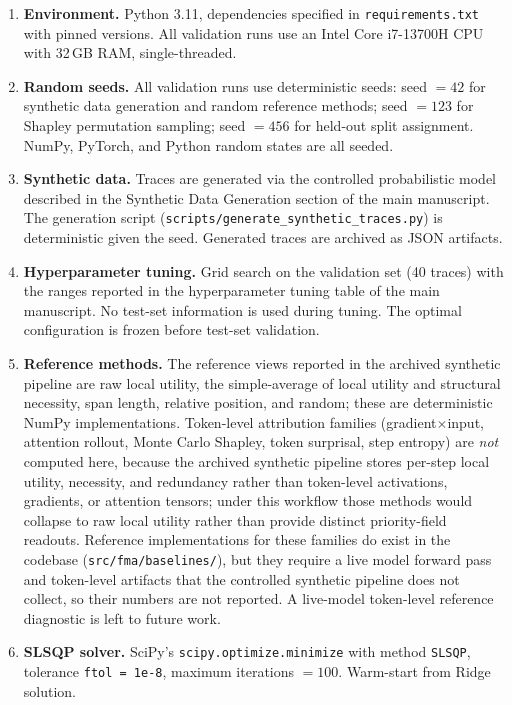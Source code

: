 \documentclass[a4paper,fleqn]{cas-sc}
\begin{document}
\begin{enumerate}
\item \textbf{Environment.} Python 3.11, dependencies specified in \texttt{requirements.txt} with pinned versions. All validation runs use an Intel Core i7-13700H CPU with 32\,GB RAM, single-threaded.
\item \textbf{Random seeds.} All validation runs use deterministic seeds: seed $= 42$ for synthetic data generation and random reference methods; seed $= 123$ for Shapley permutation sampling; seed $= 456$ for held-out split assignment. NumPy, PyTorch, and Python random states are all seeded.
\item \textbf{Synthetic data.} Traces are generated via the controlled probabilistic model described in the Synthetic Data Generation section of the main manuscript. The generation script (\texttt{scripts/generate\_synthetic\_traces.py}) is deterministic given the seed. Generated traces are archived as JSON artifacts.
\item \textbf{Hyperparameter tuning.} Grid search on the validation set (40 traces) with the ranges reported in the hyperparameter tuning table of the main manuscript. No test-set information is used during tuning. The optimal configuration is frozen before test-set validation.
\item \textbf{Reference methods.} The reference views reported in the archived synthetic pipeline are raw local utility, the simple-average of local utility and structural necessity, span length, relative position, and random; these are deterministic NumPy implementations. Token-level attribution families (gradient$\times$input, attention rollout, Monte Carlo Shapley, token surprisal, step entropy) are \emph{not} computed here, because the archived synthetic pipeline stores per-step local utility, necessity, and redundancy rather than token-level activations, gradients, or attention tensors; under this workflow those methods would collapse to raw local utility rather than provide distinct priority-field readouts. Reference implementations for these families do exist in the codebase (\texttt{src/fma/baselines/}), but they require a live model forward pass and token-level artifacts that the controlled synthetic pipeline does not collect, so their numbers are not reported. A live-model token-level reference diagnostic is left to future work.
\item \textbf{SLSQP solver.} SciPy's \texttt{scipy.optimize.minimize} with method \texttt{SLSQP}, tolerance \texttt{ftol = 1e-8}, maximum iterations $= 100$. Warm-start from Ridge solution.

\end{enumerate}
\end{document}
